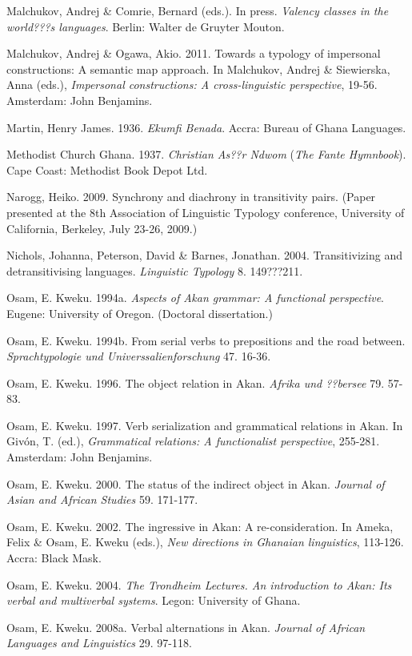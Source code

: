 \documentclass[output=paper]{langsci/langscibook}
\begin{document}
Malchukov, Andrej \& Comrie, Bernard (eds.). In press. \textit{Valency classes in the world???s languages}. Berlin: Walter de Gruyter Mouton.

Malchukov, Andrej \& Ogawa, Akio. 2011. Towards a typology of impersonal constructions: A semantic map approach. In Malchukov, Andrej \& Siewierska, Anna (eds.), \textit{Impersonal constructions: A cross-linguistic perspective}, 19-56. Amsterdam: John Benjamins.

Martin, Henry James. 1936. \emph{Ekumfi Benada}. Accra: Bureau of Ghana Languages.

Methodist Church Ghana. 1937. \textit{Christian As??r Ndwom }(\textit{The Fante Hymnbook}). Cape Coast: Methodist Book Depot Ltd.

Narogg, Heiko. 2009. Synchrony and diachrony in transitivity pairs. (Paper presented at the 8th Association of Linguistic Typology conference, University of California, Berkeley, July 23-26, 2009.)

Nichols, Johanna, Peterson, David \& Barnes, Jonathan. 2004. Transitivizing and detransitivising languages. \textit{Linguistic Typology} 8. 149???211.

Osam, E. Kweku. 1994a. \textit{Aspects of Akan grammar: A functional perspective}. Eugene: University of Oregon. (Doctoral dissertation.)

Osam, E. Kweku. 1994b. From serial verbs to prepositions and the road between. \textit{Sprachtypologie und Universsalienforschung} 47. 16-36.

Osam, E. Kweku. 1996. The object relation in Akan. \textit{Afrika und ??bersee} 79. 57-83.

Osam, E. Kweku. 1997. Verb serialization and grammatical relations in Akan. In Givón, T. (ed.), \textit{Grammatical relations: A functionalist perspective}, 255-281. Amsterdam: John Benjamins.

Osam, E. Kweku. 2000. The status of the indirect object in Akan. \textit{Journal of Asian and African Studies }59. 171-177.

Osam, E. Kweku. 2002. The ingressive in Akan: A re-consideration. In Ameka, Felix \& Osam, E. Kweku (eds.), \textit{New directions in Ghanaian linguistics}, 113-126. Accra: Black Mask.

Osam, E. Kweku. 2004. \textit{The Trondheim Lectures. An introduction to Akan: Its verbal and multiverbal systems}. Legon: University of Ghana.

Osam, E. Kweku. 2008a. Verbal alternations in Akan. \textit{Journal of African Languages and Linguistics} 29. 97-118.
\end{document}
